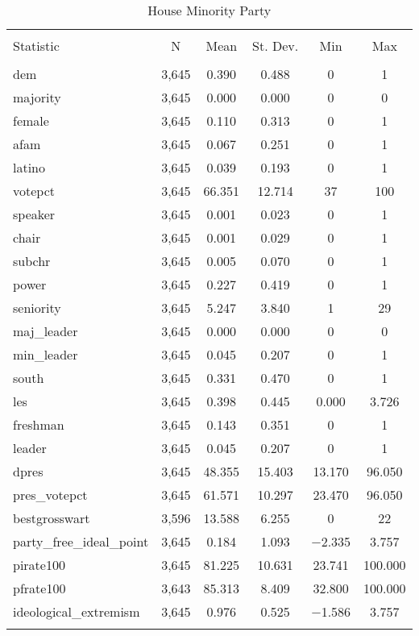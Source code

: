 \documentclass[12pt]{article}
\begin{document}
\begin{table}[ht] \centering 
	\caption{House Minority Party} 
	\label{} 
	\begin{tabular}{@{\extracolsep{5pt}}lccccc} 
		\\[-1.8ex]\hline 
		\hline \\[-1.8ex] 
		Statistic & \multicolumn{1}{c}{N} & \multicolumn{1}{c}{Mean} & \multicolumn{1}{c}{St. Dev.} & \multicolumn{1}{c}{Min} & \multicolumn{1}{c}{Max} \\ 
		\hline \\[-1.8ex] 
		dem & 3,645 & 0.390 & 0.488 & 0 & 1 \\ 
		majority & 3,645 & 0.000 & 0.000 & 0 & 0 \\ 
		female & 3,645 & 0.110 & 0.313 & 0 & 1 \\ 
		afam & 3,645 & 0.067 & 0.251 & 0 & 1 \\ 
		latino & 3,645 & 0.039 & 0.193 & 0 & 1 \\ 
		votepct & 3,645 & 66.351 & 12.714 & 37 & 100 \\ 
		speaker & 3,645 & 0.001 & 0.023 & 0 & 1 \\ 
		chair & 3,645 & 0.001 & 0.029 & 0 & 1 \\ 
		subchr & 3,645 & 0.005 & 0.070 & 0 & 1 \\ 
		power & 3,645 & 0.227 & 0.419 & 0 & 1 \\ 
		seniority & 3,645 & 5.247 & 3.840 & 1 & 29 \\ 
		maj\_leader & 3,645 & 0.000 & 0.000 & 0 & 0 \\ 
		min\_leader & 3,645 & 0.045 & 0.207 & 0 & 1 \\ 
		south & 3,645 & 0.331 & 0.470 & 0 & 1 \\ 
		les & 3,645 & 0.398 & 0.445 & 0.000 & 3.726 \\ 
		freshman & 3,645 & 0.143 & 0.351 & 0 & 1 \\ 
		leader & 3,645 & 0.045 & 0.207 & 0 & 1 \\ 
		dpres & 3,645 & 48.355 & 15.403 & 13.170 & 96.050 \\ 
		pres\_votepct & 3,645 & 61.571 & 10.297 & 23.470 & 96.050 \\ 
		bestgrosswart & 3,596 & 13.588 & 6.255 & 0 & 22 \\ 
		party\_free\_ideal\_point & 3,645 & 0.184 & 1.093 & $-$2.335 & 3.757 \\ 
		pirate100 & 3,645 & 81.225 & 10.631 & 23.741 & 100.000 \\ 
		pfrate100 & 3,643 & 85.313 & 8.409 & 32.800 & 100.000 \\ 
		ideological\_extremism & 3,645 & 0.976 & 0.525 & $-$1.586 & 3.757 \\ 
		\hline \\[-1.8ex] 
	\end{tabular} 
\end{table} 
\end{document}
